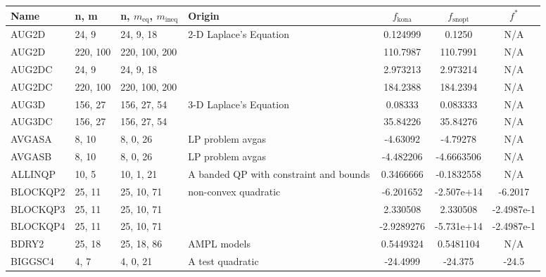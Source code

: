 \documentclass{article}
\begin{document}
\begin{tabular}{l | l |   >{\footnotesize}p{1.8cm} |  >{\footnotesize}p{2.1cm} | c | c | c  }  \hline      %
Name   &                 n,   m       &  n,  $m_{\text{eq}}$,  $m_{\text{ineq}}$        &     Origin              & $ f_{\text{kona}} $   & $ f_{\text{snopt}} $ &$ f^*$    \\ \hline
AUG2D    &           24,  9         &  24,   9,  18       &    2-D Laplace's Equation    &  0.124999           &     0.1250    &      N/A                \\ \hline
AUG2D    &          220, 100   & 220, 100, 200  &                                 &   110.7987          &    110.7991      &    N/A           \\ \hline
AUG2DC  &       24, 9      &   24, 9, 18       &       &       2.973213                & 2.973214    &   N/A     \\ \hline
AUG2DC  &      220, 100   &  220, 100, 200   &     & 184.2388    &   184.2394     &    N/A      \\ \hline
AUG3D  &      156, 27    & 156, 27, 54   & 3-D Laplace's Equation  & 0.08333   &   0.083333   &  N/A         \\ \hline
AUG3DC  &  156, 27  &  156, 27, 54   &    &   35.84226   &   35.84276      & N/A      \\ \hline
AVGASA  &       8, 10   &   8, 0, 26   &            LP problem avgas               &           -4.63092    &    -4.79278   &   N/A     \\ \hline
AVGASB  &    8, 10  &   8, 0, 26   &   LP problem avgas         &   -4.482206   &   -4.6663506     &   N/A    \\ \hline
ALLINQP  & 10, 5   &  10, 1, 21   & A banded QP with constraint and bounds  & 0.3466666  & -0.1832558     &  N/A \\  \hline     %
BLOCKQP2   & 25, 11   & 25,  10, 71   &    non-convex quadratic   & -6.201652   & -2.507e+14    &  -6.2017   \\ \hline
BLOCKQP3   & 25, 11   & 25,  10, 71  &  	   & 2.330508     &  2.330508   &            -2.4987e-1   \\ \hline
BLOCKQP4  & 25, 11    & 25, 10, 71  &       & -2.9289276   & -5.731e+14   &    -2.4987e-1   \\ \hline
BDRY2   & 25, 18   & 25, 18, 86   &  AMPL models  & 0.5449324  & 0.5481104  & N/A    \\ \hline   
BIGGSC4  & 4, 7   & 4, 0, 21   & A test quadratic  & -24.4999   &  -24.375  &    -24.5 \\ \hline 

\end{tabular}
\end{document}
